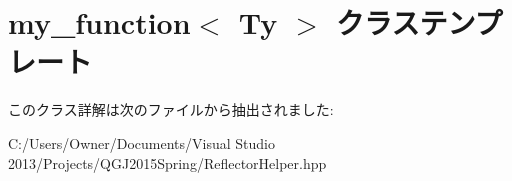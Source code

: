 \hypertarget{classmy__function}{}\section{my\+\_\+function$<$ Ty $>$ クラステンプレート}
\label{classmy__function}


このクラス詳解は次のファイルから抽出されました\+:\begin{DoxyCompactItemize}
\item 
C\+:/\+Users/\+Owner/\+Documents/\+Visual Studio 2013/\+Projects/\+Q\+G\+J2015\+Spring/Reflector\+Helper.\+hpp\end{DoxyCompactItemize}
